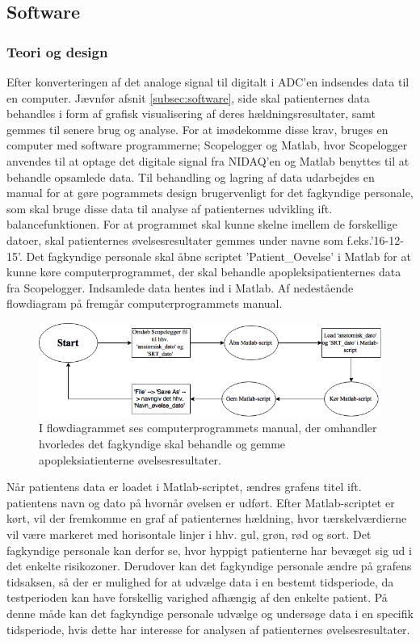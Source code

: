 \subsection{Software}
\subsubsection{Teori og design}
Efter konverteringen af det analoge signal til digitalt i ADC’en indsendes data til en computer. Jævnfør afsnit \ref{subsec:software}, side \pageref{subsec:software} skal patienternes data behandles i form af grafisk visualisering af deres hældningsresultater, samt gemmes til senere brug og analyse. For at imødekomme disse krav, bruges en computer med software programmerne; Scopelogger og Matlab, hvor Scopelogger anvendes til at optage det  digitale signal fra NIDAQ'en og Matlab benyttes til at behandle opsamlede data. Til behandling og lagring af data udarbejdes en manual for at gøre pogrammets design brugervenligt for det fagkyndige personale, som skal bruge disse data til analyse af patienternes udvikling ift. balancefunktionen. For at programmet skal kunne skelne imellem de forskellige datoer, skal patienternes øvelsesresultater gemmes under navne som f.eks.'16-12-15'. 
Det fagkyndige personale skal åbne scriptet 'Patient\_Oevelse' i Matlab for at kunne køre computerprogrammet, der skal behandle apopleksipatienternes data fra Scopelogger. Indsamlede data hentes ind i Matlab. Af nedestående flowdiagram på  fremgår computerprogrammets manual.

\begin{figure}[H] 
	\centering 
	\includegraphics[scale=0.5]{figures/cProblemloesning/Flow_manual.PNG}
	\caption{I flowdiagrammet ses computerprogrammets manual, der omhandler hvorledes det fagkyndige skal behandle og gemme apopleksiatienterne øvelsesresultater.}
	\label{Flow_manual}
\end{figure} 
Når patientens data er loadet i Matlab-scriptet, ændres grafens titel ift. patientens navn og dato på hvornår øvelsen er udført. Efter Matlab-scriptet er kørt, vil der fremkomme en graf af patienternes hældning, hvor tærskelværdierne vil være markeret med horisontale linjer i hhv. gul, grøn, rød og sort. Det fagkyndige personale kan derfor se, hvor hyppigt patienterne har bevæget sig ud i det enkelte risikozoner. Derudover kan det fagkyndige personale ændre på grafens tidsaksen, så der er mulighed for at udvælge data i en bestemt tidsperiode, da testperioden kan have forskellig varighed afhængig af den enkelte patient. På denne måde kan det fagkyndige personale udvælge og undersøge data i en specifik tidsperiode, hvis dette har interesse for analysen af patienternes øvelsesresultater.  

